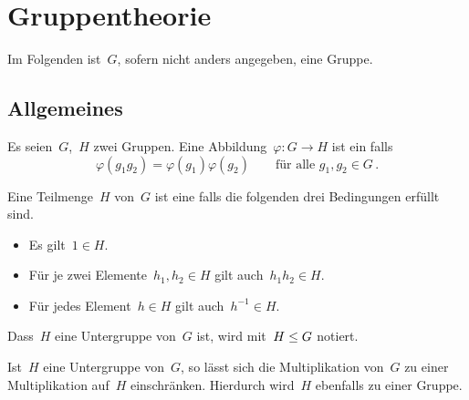 \chapter{Gruppentheorie}

\begin{convention}
  Im Folgenden ist~$G$, sofern nicht anders angegeben, eine Gruppe.
\end{convention}

\section{Allgemeines}

\begin{definition}
  Es seien~$G$,~$H$ zwei Gruppen.
  Eine Abbildung~$\varphi \colon G \to H$ ist ein  falls
  \[
    \varphi(g_1 g_2) = \varphi(g_1) \varphi(g_2)
    \qquad
    \text{für alle~$g_1, g_2 \in G$} \,.
  \]
\end{definition}

\begin{definition}
  Eine Teilmenge~$H$ von~$G$ ist eine  falls die folgenden drei Bedingungen erfüllt sind.
  \begin{itemize}
    \item
      Es gilt~$1 \in H$.
    \item
      Für je zwei Elemente~$h_1, h_2 \in H$ gilt auch~$h_1 h_2 \in H$.
    \item
      Für jedes Element~$h \in H$ gilt auch~$h^{-1} \in H$.
  \end{itemize}
  Dass~$H$ eine Untergruppe von~$G$ ist, wird mit~$H \leq G$ notiert.
\end{definition}

Ist~$H$ eine Untergruppe von~$G$, so lässt sich die Multiplikation von~$G$ zu einer Multiplikation auf~$H$ einschränken.
Hierdurch wird~$H$ ebenfalls zu einer Gruppe.

